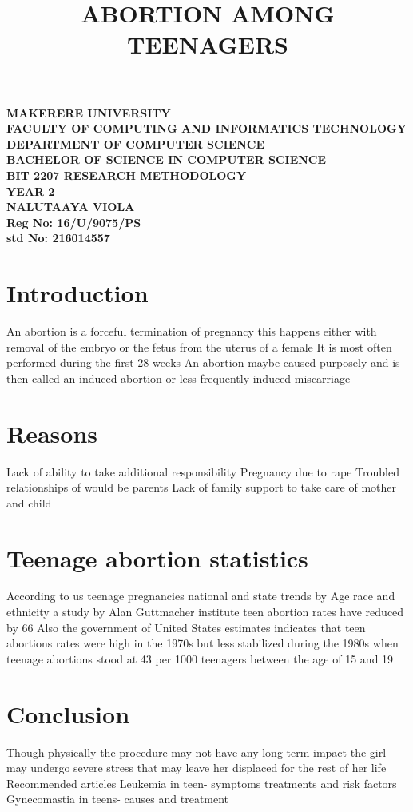 \documentclass[a4paper,12pt]{article}
\begin{document}
\begin{Huge}
\begin{center}
\begin{normalsize}

\textbf{MAKERERE UNIVERSITY } \\
\textbf{FACULTY OF COMPUTING AND INFORMATICS TECHNOLOGY} \\
\textbf{DEPARTMENT OF COMPUTER SCIENCE} \\
\textbf{BACHELOR OF SCIENCE IN COMPUTER SCIENCE} \\
\textbf{BIT 2207 RESEARCH METHODOLOGY} \\
\textbf{YEAR 2} \\


\textbf{\sc NALUTAAYA VIOLA } \\
\textbf{\sc Reg No: 16/U/9075/PS } \\
\textbf{\sc std No: 216014557}\\
\end{normalsize}
\end{center}
\end{Huge}
\newpage

\title{ABORTION AMONG TEENAGERS}
\maketitle    
\section{Introduction}
An abortion is a forceful termination of pregnancy this happens either with removal of the embryo or the fetus from the uterus of a female 
It is most often performed during the first 28 weeks 
An abortion maybe caused purposely and is then called an induced abortion or less frequently induced miscarriage
 
\section{Reasons}                                                                                                                                                                                    Lack of ability to take additional responsibility
Pregnancy due to rape
Troubled relationships of would be parents 
Lack of family support to take care of mother and child

\section{Teenage abortion statistics}
According to us teenage pregnancies national and state trends by Age race and ethnicity a study by Alan Guttmacher institute teen abortion rates have reduced by 66%
Also the government of United States estimates indicates that teen abortions rates were high in the 1970s but less stabilized during the 1980s when teenage abortions stood at 43 per 1000 teenagers between the age of 15 and 19

\section{Conclusion}
Though physically the procedure may not have any long term impact the girl may undergo severe stress that may leave her displaced for the rest of her life 
Recommended articles
Leukemia in teen- symptoms treatments and risk factors
Gynecomastia in teens- causes and treatment
\end{document}

